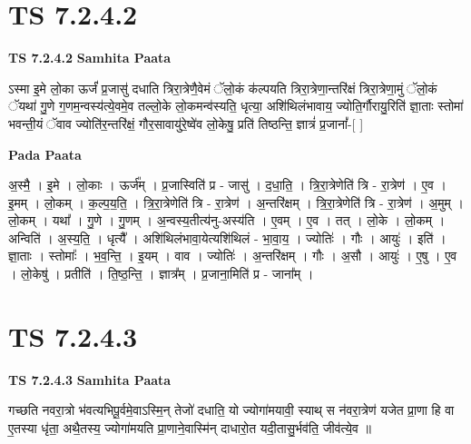 \documentclass[17pt]{extarticle}
\begin{document}
\section*{ TS 7.2.4.2 }

\textbf{TS 7.2.4.2 } \newline
\textbf{Samhita Paata} \newline

ऽस्मा इ॒मे लो॒का ऊर्जं॑ प्र॒जासु॑ दधाति त्रिरा॒त्रेणै॒वेमं ॅलो॒कं क॑ल्पयति त्रिरा॒त्रेणा॒न्तरि॑क्षं त्रिरा॒त्रेणा॒मुं ॅलो॒कं ॅयथा॑ गु॒णे ग॒णम॒न्वस्य॑त्ये॒वमे॒व तल्लो॒के लो॒कमन्व॑स्यति॒ धृत्या॒ अशि॑थिलंभावाय॒ ज्योति॒र्गौरायु॒रिति॑ ज्ञा॒ताः स्तोमा॑ भवन्ती॒यं ॅवाव ज्योति॑र॒न्तरि॑क्षं॒ गौर॒सावायु॑रे॒ष्वे॑व लो॒केषु॒ प्रति॑ तिष्ठन्ति॒ ज्ञात्रं॑ प्र॒जानां᳚-[  ] \newline

\textbf{Pada Paata} \newline

अ॒स्मै॒ । इ॒मे । लो॒काः । ऊर्ज᳚म् । प्र॒जास्विति॑ प्र - जासु॑ । द॒धा॒ति॒ । त्रि॒रा॒त्रेणेति॑ त्रि - रा॒त्रेण॑ । ए॒व । इ॒मम् । लो॒कम् । क॒ल्प॒य॒ति॒ । त्रि॒रा॒त्रेणेति॑ त्रि - रा॒त्रेण॑ । अ॒न्तरि॑क्षम् । त्रि॒रा॒त्रेणेति॑ त्रि - रा॒त्रेण॑ । अ॒मुम् । लो॒कम् । यथा᳚ । गु॒णे । गु॒णम् । अ॒न्वस्य॒तीत्य॑नु-अस्य॑ति । ए॒वम् । ए॒व । तत् । लो॒के । लो॒कम् । अन्विति॑ । अ॒स्य॒ति॒ । धृत्यै᳚ । अशि॑थिलंभावा॒येत्यशि॑थिलं - भा॒वा॒य॒ । ज्योतिः॑ । गौः । आयुः॑ । इति॑ । ज्ञा॒ताः । स्तोमाः᳚ । भ॒व॒न्ति॒ । इ॒यम् । वाव । ज्योतिः॑ । अ॒न्तरि॑क्षम् । गौः । अ॒सौ । आयुः॑ । ए॒षु । ए॒व । लो॒केषु॑ । प्रतीति॑ । ति॒ष्ठ॒न्ति॒ । ज्ञात्र᳚म् । प्र॒जाना॒मिति॑ प्र - जाना᳚म् ।  \newline




\section*{ TS 7.2.4.3 }

\textbf{TS 7.2.4.3 } \newline
\textbf{Samhita Paata} \newline

गच्छति नवरा॒त्रो भ॑वत्यभिपू॒र्वमे॒वाऽस्मि॒न् तेजो॑ दधाति॒ यो ज्योगा॑मयावी॒ स्याथ् स न॑वरा॒त्रेण॑ यजेत प्रा॒णा हि वा ए॒तस्या धृ॑ता॒ अथै॒तस्य॒ ज्योगा॑मयति प्रा॒णाने॒वास्मि॑न् दाधारो॒त यदी॒तासु॒र्भव॑ति॒ जीव॑त्ये॒व ॥ \newline
\end{document}
